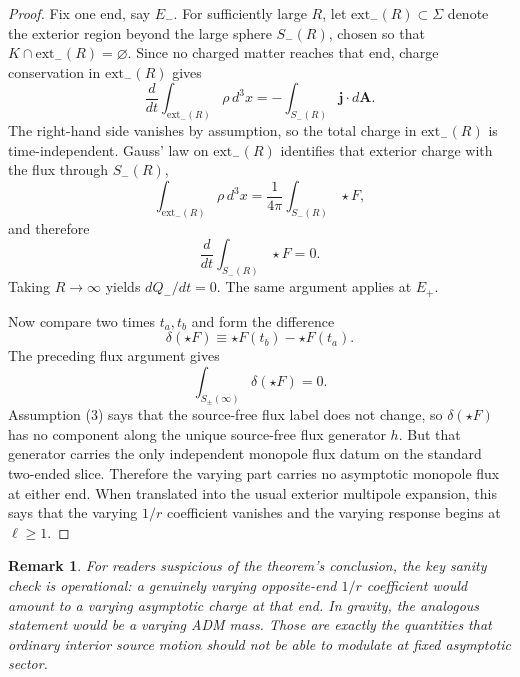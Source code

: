 \documentclass[aps,prd,onecolumn,nofootinbib,superscriptaddress]{revtex4-2}
\newtheorem{remark}{Remark}
\begin{document}
\begin{proof}
Fix one end, say $E_-$. For sufficiently large $R$, let $\mathrm{ext}_-(R)\subset \Sigma$ denote the exterior region beyond the large sphere $S_-(R)$, chosen so that $K\cap \mathrm{ext}_-(R)=\varnothing$. Since no charged matter reaches that end, charge conservation in $\mathrm{ext}_-(R)$ gives
\begin{equation}
\frac{d}{dt}\int_{\mathrm{ext}_-(R)} \rho\, d^3x
=-\int_{S_-(R)} \bm{j}\cdot d\bm{A}.
\end{equation}
The right-hand side vanishes by assumption, so the total charge in $\mathrm{ext}_-(R)$ is time-independent. Gauss' law on $\mathrm{ext}_-(R)$ identifies that exterior charge with the flux through $S_-(R)$,
\begin{equation}
\int_{\mathrm{ext}_-(R)} \rho\, d^3x
=\frac{1}{4\pi}\int_{S_-(R)} \star F,
\end{equation}
and therefore
\begin{equation}
\frac{d}{dt}\int_{S_-(R)} \star F=0.
\end{equation}
Taking $R\to\infty$ yields $dQ_-/dt=0$. The same argument applies at $E_+$.

Now compare two times $t_a,t_b$ and form the difference
\begin{equation}
\delta(\star F)\equiv \star F(t_b)-\star F(t_a).
\end{equation}
The preceding flux argument gives
\begin{equation}
\int_{S_\pm(\infty)} \delta(\star F)=0.
\end{equation}
Assumption (3) says that the source-free flux label does not change, so $\delta(\star F)$ has no component along the unique source-free flux generator $h$. But that generator carries the only independent monopole flux datum on the standard two-ended slice. Therefore the varying part carries no asymptotic monopole flux at either end. When translated into the usual exterior multipole expansion, this says that the varying $1/r$ coefficient vanishes and the varying response begins at $\ell\ge 1$.
\end{proof}

\begin{remark}
For readers suspicious of the theorem's conclusion, the key sanity check is operational: a genuinely varying opposite-end $1/r$ coefficient would amount to a varying asymptotic charge at that end. In gravity, the analogous statement would be a varying ADM mass. Those are exactly the quantities that ordinary interior source motion should \emph{not} be able to modulate at fixed asymptotic sector.
\end{remark}
\end{document}
